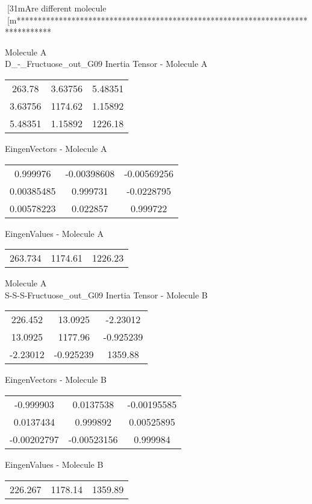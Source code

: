 [31mAre different molecule
[m********************************************************************************
\newpage
\begin{multicols}{2}
\begin{center}
Molecule A \\ 
D_-_Fructuose_out_G09
Inertia Tensor - Molecule A \\
\vtab
\begin{tabular}{|c c c|}
263.78	 & 	3.63756	 & 	5.48351	 \\
3.63756	 & 	1174.62	 & 	1.15892	 \\
5.48351	 & 	1.15892	 & 	1226.18
\end{tabular}

\vtab
 EingenVectors - Molecule A     \\
\vtab
\begin{tabular}{|c c c|}
0.999976	 & 	-0.00398608	 & 	-0.00569256	 \\
0.00385485	 & 	0.999731	 & 	-0.0228795	 \\
0.00578223	 & 	0.022857	 & 	0.999722
\end{tabular}

\vtab
 EingenValues - Molecule A     \\
\vtab
\begin{tabular}{|c c c|}
263.734	 & 	1174.61	 & 	1226.23
\end{tabular}
\columnbreak
Molecule A \\ 
S-S-S-Fructuose_out_G09
Inertia Tensor - Molecule B \\
\vtab
\begin{tabular}{|c c c|}
226.452	 & 	13.0925	 & 	-2.23012	 \\
13.0925	 & 	1177.96	 & 	-0.925239	 \\
-2.23012	 & 	-0.925239	 & 	1359.88
\end{tabular}

\vtab
 EingenVectors - Molecule B     \\
\vtab
\begin{tabular}{|c c c|}
-0.999903	 & 	0.0137538	 & 	-0.00195585	 \\
0.0137434	 & 	0.999892	 & 	0.00525895	 \\
-0.00202797	 & 	-0.00523156	 & 	0.999984
\end{tabular}

\vtab
 EingenValues - Molecule B     \\
\vtab
\begin{tabular}{|c c c|}
226.267	 & 	1178.14	 & 	1359.89
\end{tabular}
\end{center}
\end{multicols}
